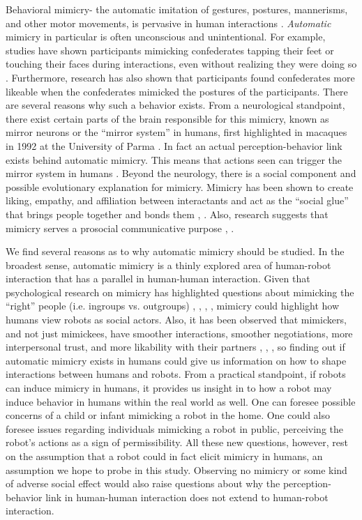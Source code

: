 \documentclass{acm_proc_article-sp}
\begin{document}
Behavioral mimicry- the automatic imitation of gestures, postures, mannerisms, and other motor movements, is pervasive in human interactions \cite{chartrand2013antecedents}. \textit{Automatic} mimicry in particular is often unconscious and unintentional. For example, studies have shown participants mimicking confederates tapping their feet or touching their faces during interactions, even without realizing they were doing so \cite{chartrand1999chameleon}. Furthermore, research has also shown that participants found confederates more likeable when the confederates mimicked the postures of the participants. There are several reasons why such a behavior exists. From a neurological standpoint, there exist certain parts of the brain responsible for this mimicry, known as mirror neurons or the ``mirror system'' in humans, first highlighted in macaques in 1992 at the University of Parma \cite{ehrenfeld2011reflections}. In fact an actual perception-behavior link exists behind automatic mimicry. This means that actions seen can trigger the mirror system in humans \cite{chartrand1999chameleon}. Beyond the neurology, there is a social component and possible evolutionary explanation for mimicry. Mimicry has been shown to create liking, empathy, and affiliation between interactants and act as the ``social glue'' that brings people together and bonds them \cite{chartrand2013antecedents}, \cite{lakin2003chameleon}. Also, research suggests that mimicry serves a prosocial communicative purpose \cite{bavelas1986show}, \cite{chartrand2013antecedents}.

We find several reasons as to why automatic mimicry should be studied. In the broadest sense, automatic mimicry is a thinly explored area of human-robot interaction that has a parallel in human-human interaction. Given that psychological research on mimicry has highlighted questions about mimicking the ``right'' people (i.e. ingroups vs. outgroups) \cite{bourgeois2008impact}, \cite{chartrand2013antecedents}, \cite{kavanagh2011s}, \cite{yabar2006implicit}, mimicry could highlight how humans view robots as social actors. Also, it has been observed that mimickers, and not just mimickees, have smoother interactions, smoother negotiations, more interpersonal trust, and more likability with their partners \cite{maddux2008chameleons}, \cite{stel2010mimicry}, \cite{swaab2011early}, so finding out if automatic mimicry exists in humans could give us information on how to shape interactions between humans and robots. From a practical standpoint, if robots can induce mimicry in humans, it provides us insight in to how a robot may induce behavior in humans within the real world as well. One can foresee possible concerns of a child or infant mimicking a robot in the home. One could also foresee issues regarding individuals mimicking a robot in public, perceiving the robot's actions as a sign of permissibility. All these new questions, however, rest on the assumption that a robot could in fact elicit mimicry in humans, an assumption we hope to probe in this study. Observing no mimicry or some kind of adverse social effect would also raise questions about why the perception-behavior link in human-human interaction does not extend to human-robot interaction.
\end{document}
